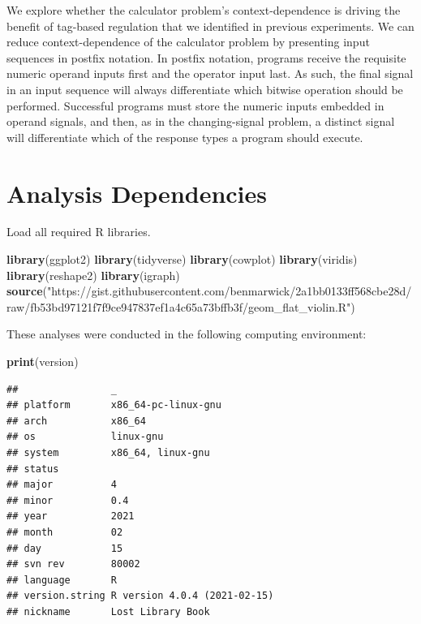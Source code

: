 \documentclass[]{book}
\newenvironment{Shaded}{\begin{snugshade}}{\end{snugshade}}
\newcommand{\KeywordTok}[1]{\textcolor[rgb]{0.13,0.29,0.53}{\textbf{#1}}}
\newcommand{\NormalTok}[1]{#1}
\newcommand{\StringTok}[1]{\textcolor[rgb]{0.31,0.60,0.02}{#1}}
\begin{document}
We explore whether the calculator problem's context-dependence is driving the benefit of tag-based regulation that we identified in previous experiments.
We can reduce context-dependence of the calculator problem by presenting input sequences in postfix notation.
In postfix notation, programs receive the requisite numeric operand inputs first and the operator input last.
As such, the final signal in an input sequence will always differentiate which bitwise operation should be performed.
Successful programs must store the numeric inputs embedded in operand signals, and then, as in the changing-signal problem, a distinct signal will differentiate which of the response types a program should execute.

\hypertarget{analysis-dependencies-5}{%
\section{Analysis Dependencies}\label{analysis-dependencies-5}}

Load all required R libraries.

\begin{Shaded}
\begin{Highlighting}[]
\KeywordTok{library}\NormalTok{(ggplot2)}
\KeywordTok{library}\NormalTok{(tidyverse)}
\KeywordTok{library}\NormalTok{(cowplot)}
\KeywordTok{library}\NormalTok{(viridis)}
\KeywordTok{library}\NormalTok{(reshape2)}
\KeywordTok{library}\NormalTok{(igraph)}
\KeywordTok{source}\NormalTok{(}\StringTok{"https://gist.githubusercontent.com/benmarwick/2a1bb0133ff568cbe28d/raw/fb53bd97121f7f9ce947837ef1a4c65a73bffb3f/geom_flat_violin.R"}\NormalTok{)}
\end{Highlighting}
\end{Shaded}

These analyses were conducted in the following computing environment:

\begin{Shaded}
\begin{Highlighting}[]
\KeywordTok{print}\NormalTok{(version)}
\end{Highlighting}
\end{Shaded}

\begin{verbatim}
##                _                           
## platform       x86_64-pc-linux-gnu         
## arch           x86_64                      
## os             linux-gnu                   
## system         x86_64, linux-gnu           
## status                                     
## major          4                           
## minor          0.4                         
## year           2021                        
## month          02                          
## day            15                          
## svn rev        80002                       
## language       R                           
## version.string R version 4.0.4 (2021-02-15)
## nickname       Lost Library Book
\end{verbatim}
\end{document}
